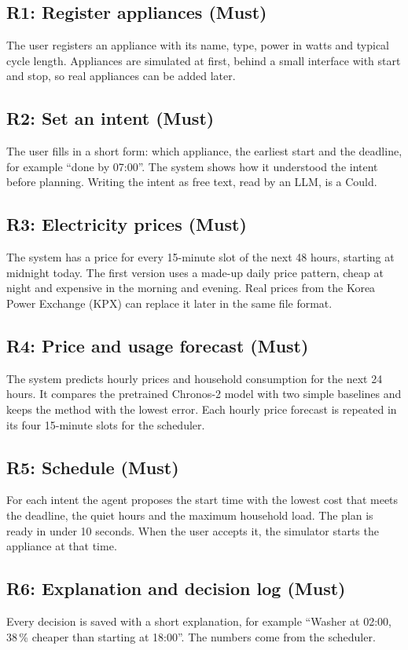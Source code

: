\documentclass[conference,a4paper]{IEEEtran}
\begin{document}
\subsection{R1: Register appliances (Must)}
The user registers an appliance with its name, type, power in watts and typical cycle length. Appliances are simulated at first, behind a small interface with start and stop, so real appliances can be added later.

\subsection{R2: Set an intent (Must)}
The user fills in a short form: which appliance, the earliest start and the deadline, for example ``done by 07:00''. The system shows how it understood the intent before planning. Writing the intent as free text, read by an LLM, is a Could.

\subsection{R3: Electricity prices (Must)}
The system has a price for every 15-minute slot of the next 48 hours, starting at midnight today. The first version uses a made-up daily price pattern, cheap at night and expensive in the morning and evening. Real prices from the Korea Power Exchange (KPX) can replace it later in the same file format.

\subsection{R4: Price and usage forecast (Must)}
The system predicts hourly prices and household consumption for the next 24 hours. It compares the pretrained Chronos-2 model with two simple baselines and keeps the method with the lowest error. Each hourly price forecast is repeated in its four 15-minute slots for the scheduler.

\subsection{R5: Schedule (Must)}
For each intent the agent proposes the start time with the lowest cost that meets the deadline, the quiet hours and the maximum household load. The plan is ready in under 10 seconds. When the user accepts it, the simulator starts the appliance at that time.

\subsection{R6: Explanation and decision log (Must)}
Every decision is saved with a short explanation, for example ``Washer at 02:00, 38\,\% cheaper than starting at 18:00''. The numbers come from the scheduler.
\end{document}

